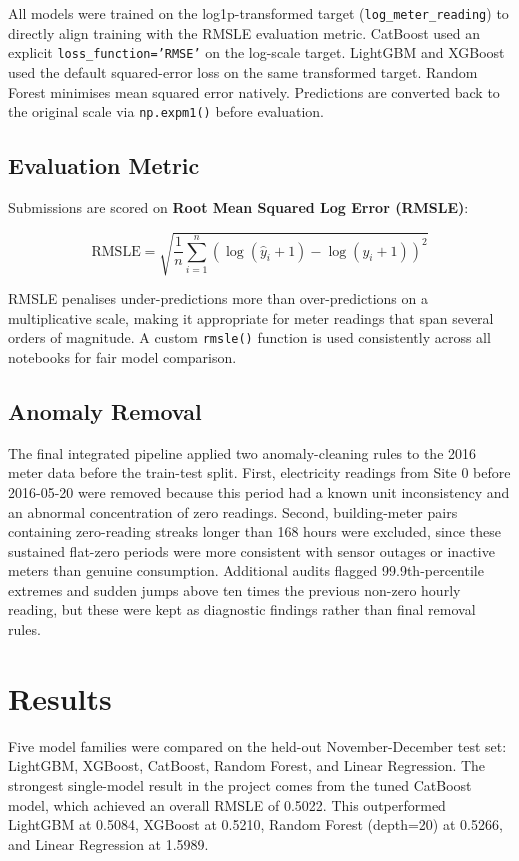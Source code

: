 \documentclass{article}
\begin{document}
All models were trained on the log1p-transformed target (\texttt{log\_meter\_reading}) to directly align training with the RMSLE evaluation metric. CatBoost used an explicit \texttt{loss\_function='RMSE'} on the log-scale target. LightGBM and XGBoost used the default squared-error loss on the same transformed target. Random Forest minimises mean squared error natively. Predictions are converted back to the original scale via \texttt{np.expm1()} before evaluation.


\subsection{Evaluation Metric}
Submissions are scored on \textbf{Root Mean Squared Log Error (RMSLE)}:

\[
\text{RMSLE} = \sqrt{\frac{1}{n} \sum_{i=1}^{n} \left( \log(\hat{y}_i + 1) - \log(y_i + 1) \right)^2 }
\]

RMSLE penalises under-predictions more than over-predictions on a multiplicative scale, making it appropriate for meter readings that span several orders of magnitude. A custom \texttt{rmsle()} function is used consistently across all notebooks for fair model comparison.

\subsection{Anomaly Removal}
The final integrated pipeline applied two anomaly-cleaning rules to the 2016 meter data before the train-test split. First, electricity readings from Site 0 before 2016-05-20 were removed because this period had a known unit inconsistency and an abnormal concentration of zero readings. Second, building-meter pairs containing zero-reading streaks longer than 168 hours were excluded, since these sustained flat-zero periods were more consistent with sensor outages or inactive meters than genuine consumption. Additional audits flagged 99.9th-percentile extremes and sudden jumps above ten times the previous non-zero hourly reading, but these were kept as diagnostic findings rather than final removal rules.


\section{Results}

Five model families were compared on the held-out November-December test set: LightGBM, XGBoost, CatBoost, Random Forest, and Linear Regression. The strongest single-model result in the project comes from the tuned CatBoost model, which achieved an overall RMSLE of 0.5022. This outperformed LightGBM at 0.5084, XGBoost at 0.5210, Random Forest (depth=20) at 0.5266, and Linear Regression at 1.5989.
\end{document}
